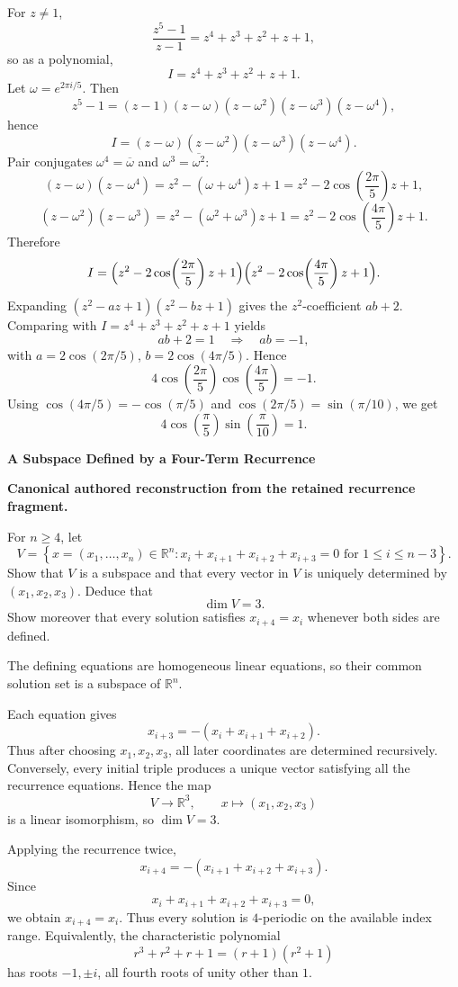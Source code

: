 \begin{solution}
For \(z\neq1\),
\[
\frac{z^5-1}{z-1}=z^4+z^3+z^2+z+1,
\]
so as a polynomial,
\[
I=z^4+z^3+z^2+z+1.
\]
Let \(\omega=e^{2\pi i/5}\). Then
\[
z^5-1=(z-1)(z-\omega)(z-\omega^2)(z-\omega^3)(z-\omega^4),
\]
hence
\[
I=(z-\omega)(z-\omega^2)(z-\omega^3)(z-\omega^4).
\]
Pair conjugates \(\omega^4=\overline{\omega}\) and \(\omega^3=\overline{\omega^2}\):
\[
(z-\omega)(z-\omega^4)=z^2-(\omega+\omega^4)z+1
= z^2-2\cos\!\left(\frac{2\pi}{5}\right)z+1,
\]
\[
(z-\omega^2)(z-\omega^3)=z^2-(\omega^2+\omega^3)z+1
= z^2-2\cos\!\left(\frac{4\pi}{5}\right)z+1.
\]
Therefore
\[
I=\Bigl(z^2-2\cos\!\left(\frac{2\pi}{5}\right)z+1\Bigr)
\Bigl(z^2-2\cos\!\left(\frac{4\pi}{5}\right)z+1\Bigr).
\]
Expanding \((z^2-az+1)(z^2-bz+1)\) gives the \(z^2\)-coefficient \(ab+2\). Comparing with
\(I=z^4+z^3+z^2+z+1\) yields
\[
ab+2=1\quad\Longrightarrow\quad ab=-1,
\]
with \(a=2\cos(2\pi/5)\), \(b=2\cos(4\pi/5)\). Hence
\[
4\cos\!\left(\frac{2\pi}{5}\right)\cos\!\left(\frac{4\pi}{5}\right)=-1.
\]
Using \(\cos(4\pi/5)=-\cos(\pi/5)\) and \(\cos(2\pi/5)=\sin(\pi/10)\), we get
\[
4\cos\!\left(\frac{\pi}{5}\right)\sin\!\left(\frac{\pi}{10}\right)=1.
\]
\end{solution}

\begin{problem}[CP-I-0035]
\label{prob:cp-i-0035}
\textbf{A Subspace Defined by a Four-Term Recurrence}

\textbf{Canonical authored reconstruction from the retained recurrence fragment.}

\hspace*{1.5em}For \(n\ge 4\), let
\[
V=\left\{x=(x_1,\dots,x_n)\in\mathbb R^n:
x_i+x_{i+1}+x_{i+2}+x_{i+3}=0
\text{ for }1\le i\le n-3\right\}.
\]
Show that \(V\) is a subspace and that every vector in \(V\) is uniquely determined by
\((x_1,x_2,x_3)\). Deduce that
\[
\dim V=3.
\]
Show moreover that every solution satisfies \(x_{i+4}=x_i\) whenever both sides are defined.
\end{problem}

\begin{solution}
The defining equations are homogeneous linear equations, so their common solution set is a
subspace of \(\mathbb R^n\).

Each equation gives
\[
x_{i+3}=-(x_i+x_{i+1}+x_{i+2}).
\]
Thus after choosing \(x_1,x_2,x_3\), all later coordinates are determined recursively. Conversely,
every initial triple produces a unique vector satisfying all the recurrence equations. Hence the
map
\[
V\longrightarrow\mathbb R^3,\qquad x\longmapsto(x_1,x_2,x_3)
\]
is a linear isomorphism, so \(\dim V=3\).

Applying the recurrence twice,
\[
x_{i+4}=-(x_{i+1}+x_{i+2}+x_{i+3}).
\]
Since
\[
x_i+x_{i+1}+x_{i+2}+x_{i+3}=0,
\]
we obtain \(x_{i+4}=x_i\). Thus every solution is \(4\)-periodic on the available index range.
Equivalently, the characteristic polynomial
\[
r^3+r^2+r+1=(r+1)(r^2+1)
\]
has roots \(-1,\pm i\), all fourth roots of unity other than \(1\).
\end{solution}

